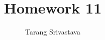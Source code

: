 \documentclass[10pt, twocolumn]{article}
\title{Homework 11}
\author{Tarang Srivastava}
\begin{document}
\makechaptertitle
\end{document}
